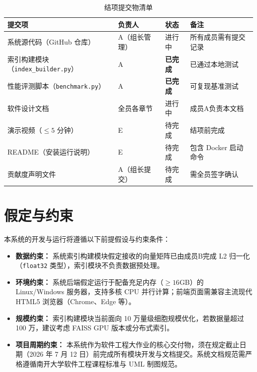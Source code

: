 \documentclass[a4paper]{article}
\begin{document}
\begin{table}[H]
\centering
\small
\caption{结项提交物清单}
\begin{tabularx}{\linewidth}{p{4cm}p{3cm}p{1.8cm}X}
\toprule
提交项 & 负责人 & 状态 & 备注 \\
\midrule
系统源代码（GitHub 仓库） & A（组长管理） & 进行中 & 所有成员需有提交记录 \\
索引构建模块（\texttt{index\_builder.py}） & A & \textbf{已完成} & 已通过本地测试 \\
性能评测脚本（\texttt{benchmark.py}） & A & \textbf{已完成} & 可复现基准测试 \\
软件设计文档 & 全员各章节 & 进行中 & 成员A负责本文档 \\
演示视频（$\leq 5$ 分钟） & E & 待完成 & 结项前完成 \\
README（安装运行说明） & E & 待完成 & 包含 Docker 启动命令 \\
贡献度声明文件 & A（组长提交） & 待完成 & 需全员签字确认 \\
\bottomrule
\end{tabularx}
\end{table}

\section{假定与约束}

本系统的开发与运行将遵循以下前提假设与约束条件：

\begin{itemize}
    \item \textbf{数据约束：} 系统索引构建模块假定接收的向量矩阵已由成员B完成 L2 归一化（\texttt{float32} 类型），索引模块不负责数据预处理。
    \item \textbf{环境约束：} 系统后端假定运行于配备充足内存（$\geq 16$GB）的 Linux/Windows 服务器，支持多核 CPU 并行计算；前端页面需兼容主流现代 HTML5 浏览器（Chrome、Edge 等）。
    \item \textbf{规模约束：} 索引构建模块当前面向 10 万量级细胞规模优化，若数据量超过 100 万，建议考虑 FAISS GPU 版本或分布式索引。
    \item \textbf{项目周期约束：} 本系统作为软件工程大作业的核心交付物，须在规定截止日期（2026 年 7 月 12 日）前完成所有模块开发与文档提交。系统文档规范需严格遵循南开大学软件工程课程标准与 UML 制图规范。
\end{itemize}
\end{document}
